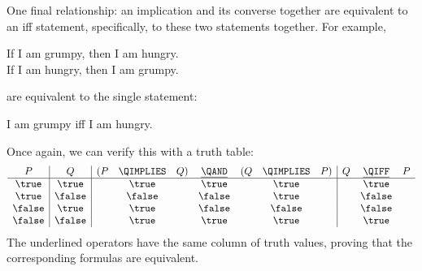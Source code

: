 One final relationship: an implication and its converse together are
equivalent to an iff statement, specifically, to these two statements
together.  For example,
%
\begin{center}
If I am grumpy, then I am hungry. \\
If I am hungry, then I am grumpy.
\end{center}
%
are equivalent to the single statement:
%
\begin{center}
I am grumpy iff I am hungry.
\end{center}
%
Once again, we can verify this with a truth table:
%
\[
\begin{array}{c|c|rclcrcl|rcl}
P & Q &
    (P &\QIMPLIES& Q) &\underline{\QAND}&  (Q &\QIMPLIES& P) & Q &\underline{\QIFF}& P \\
\hline
\true  &  \true  & &\true & &\true & &\true & & &\true & \\
\true  &  \false & &\false& &\false& &\true & & &\false& \\
\false &  \true  & &\true & &\false& &\false& & &\false& \\
\false &  \false & &\true & &\true & &\true & & &\true &
\end{array}
\]
The underlined operators have the same column of truth values, proving
that the corresponding formulas are equivalent.


